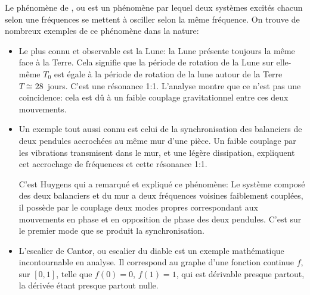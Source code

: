\medskip
Le phénomène de , ou 
 est un phénomène par lequel deux systèmes excités 
chacun selon une fréquences se mettent à osciller selon la même fréquence. On trouve de nombreux 
exemples de ce phénomène dans la nature:%
\begin{itemize}
   \item Le plus connu et observable est la Lune: la Lune présente toujours la même face à la Terre. 
	Cela signifie que la période de rotation de la Lune sur elle-même $T_0$ est égale à la 
	période de rotation de la lune autour de la Terre $T\cong 28$~jours. C'est une
	résonance 1:1. L'analyse montre que ce n'est pas une coincidence: cela
	est dû à un faible couplage gravitationnel entre ces deux mouvements.

   \item Un exemple tout aussi connu est celui de la synchronisation des balanciers de deux pendules accrochées 
	au même mur d'une pièce. Un faible couplage par les vibrations transmisent dans le mur, 
	et une légère dissipation, expliquent cet accrochage de fréquences et cette résonance 1:1.

	C'est Huygens qui a 
	remarqué et expliqué ce phénomène:
	Le système composé des deux balanciers et du mur a deux fréquences voisines faiblement 
	couplées, il possède par le couplage deux modes propres correspondant aux mouvements en 
	phase et en opposition de phase des deux pendules. C'est sur le premier mode 
	que se produit la synchronisation. 

   \item L'escalier de Cantor, 
	ou escalier du diable est un exemple mathématique incontournable en analyse.
	Il correspond au graphe d'une fonction continue $f$, sur $[0,1]$, telle que $f(0)=0$, $f(1)=1$, 
	qui est dérivable presque partout, la dérivée étant presque partout nulle.


\end{itemize}

